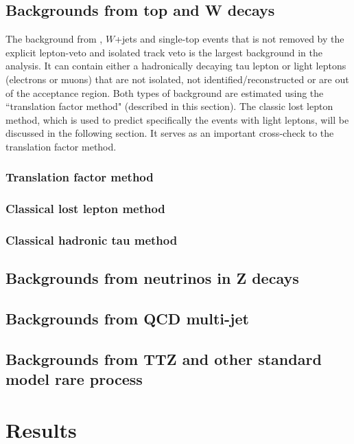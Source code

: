 \clearpage
\subsection{Backgrounds from top and W decays}
The background from \ttbar, $W$+jets and single-top events that is not removed by the explicit lepton-veto and isolated track veto is the largest background in the analysis. It can contain either a hadronically decaying tau lepton or light leptons (electrons or muons) that are not isolated, not identified/reconstructed or are out of the acceptance region. Both types of background are estimated using the ``translation factor method" (described in this section). The classic lost lepton method, which is used to predict specifically the events with light leptons, will be discussed in the following section. It serves as an important cross-check to the translation factor method.

\clearpage
\subsubsection{Translation factor method}
\label{sec:c4bgtf}


\clearpage
\subsubsection{Classical lost lepton method}
\label{sec:c4bgll}


\clearpage
\subsubsection{Classical hadronic tau method}
\label{sec:c4bghadtau}


\clearpage
\subsection{Backgrounds from neutrinos in Z decays}
\label{sec:c4bgzinv}


\clearpage
\subsection{Backgrounds from QCD multi-jet}
\label{sec:c4bgqcd}


\clearpage
\subsection{Backgrounds from TTZ and other standard model rare process}
\label{sec:c4bgttzrare}


\clearpage
\section{Results}
\label{sec:c4results}

